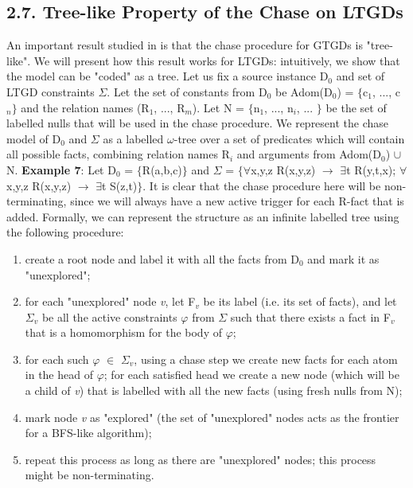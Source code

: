 \documentclass[11pt, a4paper, dvipsnames]{article}
\begin{document}
\subsection{2.7. Tree-like Property of the Chase on LTGDs}
An important result studied in \cite{decidable} is that the chase procedure for GTGDs is "tree-like". We will present how this result works for LTGDs: 
intuitively, we show that the model can be "coded" as a tree.\newline
Let us fix a source instance D$_{0}$ and set of LTGD constraints $\Sigma$. Let the set of constants from D$_{0}$ be Adom(D$_{0}$) = $\{$c$_{1}$, ..., c$_{n}\}$ and the relation names (R$_{1}$, ..., R$_{m}$). Let N = $\{$n$_{1}$, ..., n$_{i}$, ... $\}$ be the set of labelled nulls that will be used in the chase procedure. We represent the chase model of D$_{0}$ and $\Sigma$ as a labelled $\omega$-tree over a set of predicates which will contain all possible facts, combining relation names R$_{i}$ and arguments from Adom(D$_{0}$) $\cup$ N.\newline
\textbf{Example 7}: Let D$_{0}$ = $\{$R(a,b,c)$\}$ and $\Sigma$ = $\{\forall$x,y,z R(x,y,z) $\rightarrow$ $\exists$t R(y,t,x); $\forall$x,y,z R(x,y,z) $\rightarrow$ $\exists$t S(z,t)$\}$. It is clear that the chase procedure here will be non-terminating, since we will always have a new active trigger for each R-fact that is added.\newline 
Formally, we can represent the structure as an infinite labelled tree using the following procedure:
\begin{enumerate}
	\item create a root node and label it with all the facts from D$_{0}$ and mark it as "unexplored";
	\item for each "unexplored" node \textit{v}, let F$_{v}$ be its label (i.e. its set of facts), and let $\Sigma_{v}$ be all the active constraints $\varphi$ from $\Sigma$ such that there exists a fact in F$_{v}$ that is a homomorphism for the body of $\varphi$;
	\item for each such $\varphi$ $\in$ $\Sigma_{v}$, using a chase step we create new facts for each atom in the head of $\varphi$; for each satisfied head we create a new node (which will be a child of \textit{v}) that is labelled with all the new facts (using fresh nulls from N);
	\item mark node \textit{v} as "explored" (the set of "unexplored" nodes acts as the frontier for a BFS-like algorithm);
	\item repeat this process as long as there are "unexplored" nodes; this process might be non-terminating.
\end{enumerate}
\end{document}
